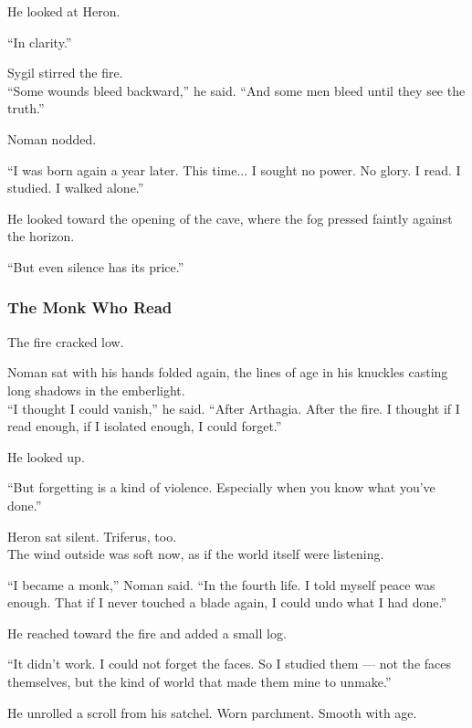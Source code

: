 \documentclass[12pt]{article}
\begin{document}
He looked at Heron.

“In clarity.”

\vspace{1em}

Sygil stirred the fire.\\
“Some wounds bleed backward,” he said. “And some men bleed until they see the truth.”

Noman nodded.

“I was born again a year later. This time... I sought no power. No glory. I read. I studied. I walked alone.”

He looked toward the opening of the cave, where the fog pressed faintly against the horizon.

“But even silence has its price.”

\dotfill

\subsubsection{The Monk Who Read}

The fire cracked low.

Noman sat with his hands folded again, the lines of age in his knuckles casting long shadows in the emberlight.\\
“I thought I could vanish,” he said. “After Arthagia. After the fire. I thought if I read enough, if I isolated enough, I could forget.”

He looked up.

“But forgetting is a kind of violence. Especially when you know what you’ve done.”

\vspace{1em}

Heron sat silent. Triferus, too.\\
The wind outside was soft now, as if the world itself were listening.

“I became a monk,” Noman said. “In the fourth life. I told myself peace was enough. That if I never touched a blade again, I could undo what I had done.”

He reached toward the fire and added a small log.

“It didn’t work. I could not forget the faces. So I studied them — not the faces themselves, but the kind of world that made them mine to unmake.”

\vspace{1em}

He unrolled a scroll from his satchel. Worn parchment. Smooth with age.
\end{document}
